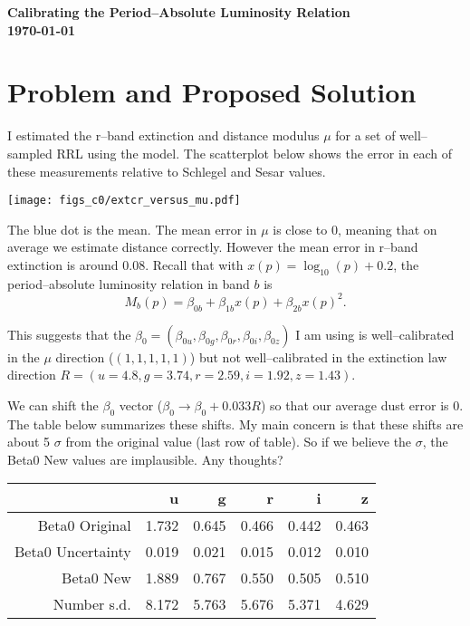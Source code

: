 \documentclass[12pt]{article}
\title{}
\date{}
\author{}
\begin{document}
\noindent
\textbf{Calibrating the Period--Absolute Luminosity Relation}\\
\textbf{\today}\\

\section{Problem and Proposed Solution}

I estimated the r--band extinction and distance modulus $\mu$ for a set of well--sampled RRL using the model. The scatterplot below shows the error in each of these measurements relative to Schlegel and Sesar values.

\begin{center}
\texttt{[image: figs\_c0/extcr\_versus\_mu.pdf]}
\end{center}

The blue dot is the mean. The mean error in $\mu$ is close to $0$, meaning that on average we estimate distance correctly. However the mean error in r--band extinction is around $0.08$. Recall that with $x(p) = \log_{10}(p) + 0.2$, the period--absolute luminosity relation in band $b$ is
\begin{equation*}
  M_{b}(p) = \beta_{0b} + \beta_{1b}x(p)  + \beta_{2b}x(p)^2.
\end{equation*}


This suggests that the $\beta_0 = (\beta_{0u},\beta_{0g},\beta_{0r},\beta_{0i},\beta_{0z})$ I am using is well--calibrated in the $\mu$ direction ($(1,1,1,1,1)$) but not well--calibrated in the extinction law direction $R = (u=4.8,g=3.74,r=2.59,i=1.92,z=1.43)$.

We can shift the $\beta_0$ vector ($\beta_0 \rightarrow \beta_0 + 0.033R$) so that our average dust error is 0. The table below summarizes these shifts. My main concern is that these shifts are about 5 $\sigma$ from the original value (last row of table). So if we believe the $\sigma$, the Beta0 New values are implausible. Any thoughts?

\begin{center}
\begin{tabular}{rrrrrr}
  & u & g & r & i & z \\ 
  \hline
Beta0 Original & 1.732 & 0.645 & 0.466 & 0.442 & 0.463 \\ 
  Beta0 Uncertainty & 0.019 & 0.021 & 0.015 & 0.012 & 0.010 \\ 
  Beta0 New & 1.889 & 0.767 & 0.550 & 0.505 & 0.510 \\ 
  Number s.d. & 8.172 & 5.763 & 5.676 & 5.371 & 4.629 \\ 
  \end{tabular}
\end{center}
\end{document}
